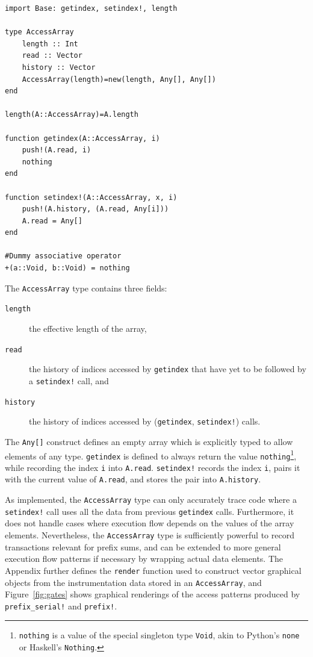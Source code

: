 \documentclass{sig-alternate}
\newcommand{\code}[1]{\texttt{#1}}
\begin{document}
\begin{verbatim}
import Base: getindex, setindex!, length

type AccessArray
    length :: Int
    read :: Vector
    history :: Vector
    AccessArray(length)=new(length, Any[], Any[])
end

length(A::AccessArray)=A.length

function getindex(A::AccessArray, i)
    push!(A.read, i)
    nothing
end

function setindex!(A::AccessArray, x, i)
    push!(A.history, (A.read, Any[i]))
    A.read = Any[]
end

#Dummy associative operator
+(a::Void, b::Void) = nothing
\end{verbatim}
%
The \code{AccessArray} type contains three fields:

\begin{description}
	\item[\code{length}] the effective length of the array,
	\item[\code{read}] the history of indices accessed by \code{getindex}
		that have yet to be followed by a \code{setindex!} call, and
	\item[\code{history}] the history of indices accessed by
		(\code{getindex}, \code{set\-index!}) calls.
\end{description}
%
The \code{Any[]} construct defines an empty array which is explicitly typed to
allow elements of any type. \code{getindex} is defined to always return the value
\code{nothing}\footnote{\code{nothing} is a value of the special
singleton type \code{Void}, akin to Python's \code{none} or Haskell's
\code{Nothing}.}, while recording the index \code{i} into \code{A.read}.
\code{setindex!} records the index \code{i}, pairs it with the current value of
\code{A.read}, and stores the pair into \code{A.history}.

As implemented, the \code{AccessArray} type can only accurately trace code
where a \code{setindex!} call uses all the data from previous \code{getindex}
calls. Furthermore, it does not handle cases where execution flow depends on
the values of the array elements. Nevertheless, the \code{AccessArray} type is
sufficiently powerful to record transactions relevant for prefix sums, and can
be extended to more general execution flow patterns if necessary by wrapping
actual data elements. The Appendix further defines the \code{render} function
used to construct vector graphical objects from the instrumentation data stored
in an \code{AccessArray}, and Figure~\ref{fig:gates} shows graphical renderings
of the access patterns produced by \code{prefix\_serial!} and \code{prefix!}.
\end{document}

